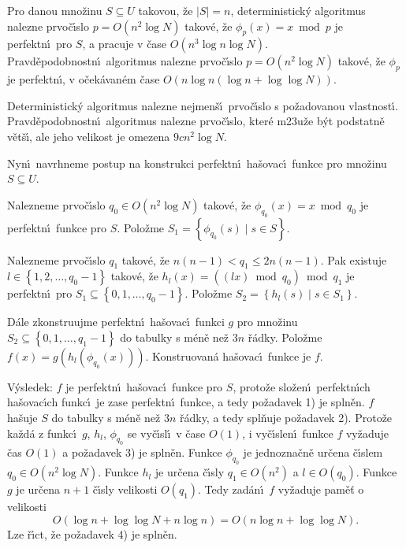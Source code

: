 Pro danou mno\v zinu $S\subseteq U$ takovou, \v ze 
$|S|=n$, deterministick\'y algoritmus nalezne prvo\v c\'\i slo 
$p=O\left(n^2\log N\right)$ takov\'e, \v ze $\phi_p\left(x\right)=x\bmod p$ je perfektn\'\i\ 
pro $S$, a pracuje v \v case $O\left(n^3\log n\log N\right)$. Pravd\v epodobnostn\'\i\ 
algoritmus nalezne pr\-vo\v c\'\i slo $p=O\left(n^2\log N\right)$ takov\'e, \v ze 
$\phi_p$ je perfektn\'\i , v o\v cek\'ava\-n\'em \v case 
$O\left(n\log n\left(\log n+\log\log N\right)\right)$.
\endproclaim

\flushpar Deterministick\'y algoritmus nalezne nejmen\v s\'\i\ prvo\v c\'\i slo s 
po\-\v za\-dovanou vlastnost\'\i .  Prav\-d\v e\-podobnostn\'\i\ algoritmus 
nalezne prvo\v c\'\i slo, kter\'e m\accent23u\v ze b\'yt podstatn\v e 
v\v et\v s\'\i , ale jeho velikost je omezena $9cn^2\log N$. 
\medskip

\flushpar Nyn\'\i\ navrhneme postup na konstrukci perfektn\'\i\ 
ha\v sovac\'\i\ funk\-ce pro mno\v zinu $S\subseteq U$.

\roster
\item 
Nalezneme prvo\v c\'\i slo $q_0\in O\left(n^2\log N\right)$ takov\'e, \v ze 
$\phi_{q_0}\left(x\right)=x\bmod q_0$ je perfektn\'\i\ funkce pro $S$. Polo\v zme 
$S_1=\left\{\phi_{q_0}\left(s\right)\mid s\in S\right\}$.
\item
Nalezneme prvo\v c\'\i slo $q_1$ takov\'e, \v ze 
$n\left(n-1\right)<q_1\le 2n\left(n-1\right)$. Pak existuje 
$l\in \left\{1,2,\dots,q_0-1\right\}$ takov\'e, \v ze $h_l\left(x\right)=\left(\left(lx\right)\bmod q_0
\right)\bmod q_1$ 
je perfektn\'\i\ pro $S_1\subseteq \left\{0,1,\dots,q_0-1\right\}$. Polo\v zme 
$S_2=\left\{h_l\left(s\right)\mid s\in S_1\right\}$.
\item
D\'ale zkonstruujme perfektn\'\i\ ha\v sovac\'\i\ funkci 
$g$ pro mno\v zinu 
$S_2\subseteq \left\{0,1,\dots,q_1-1\right\}$ do tabulky s m\'en\v e ne\v z $
3n$ \v r\'adky. 
Polo\v zme $f\left(x\right)=g\left(h_l\left(\phi_{q_0}\left(x\right)\right)\right)$. Konstruovan\'a ha\v sovac\'\i\ 
funkce je $f$.
\endroster

\flushpar V\'ysledek: $f$ je perfektn\'\i\ ha\v sovac\'\i\ funkce pro $
S$, proto\v ze 
slo\v zen\'\i\ perfektn\'\i ch ha\v sovac\'\i ch funkc\'\i\ je zase perfektn\'\i\ 
funkce, a tedy po\v zadavek 1) je spln\v en. \newline 
$f$ ha\v suje $S$ do tabulky s m\'en\v e ne\v z $3n$ \v r\'adky, a tedy 
spl\v nuje po\v zadavek 2). \newline 
Proto\v ze ka\v zd\'a z funkc\'\i\ $g$, $h_l$, $\phi_{q_0}$ se vy\v c\'\i sl\'\i\ v \v case $
O\left(1\right)$, 
i vy\v c\'\i slen\'\i\ funkce $f$ vy\v zaduje \v cas $O\left(1\right)$ a po\v zadavek 3) je 
spln\v en.\newline 
Funkce $\phi_{q_0}$ je jednozna\v cn\v e ur\v cena \v c\'\i slem $
q_0\in O\left(n^2\log N\right)$. 
Funkce $h_l$ je ur\v cena \v c\'\i sly $q_1\in O\left(n^2\right)$ a $l\in O\left(
q_0\right)$. Funkce $g$ 
je ur\v cena $n+1$ \v c\'\i sly velikosti $O\left(q_1\right)$. Tedy zad\'an\'\i\ $
f$ 
vy\v zaduje pam\v e\v t o velikosti 
$$O\left(\log n+\log\log N+n\log n\right)=O\left(n\log n+\log\log N\right).$$
Lze \v r\'\i ct, \v ze po\v zadavek 4) je spln\v en. 
\medskip

